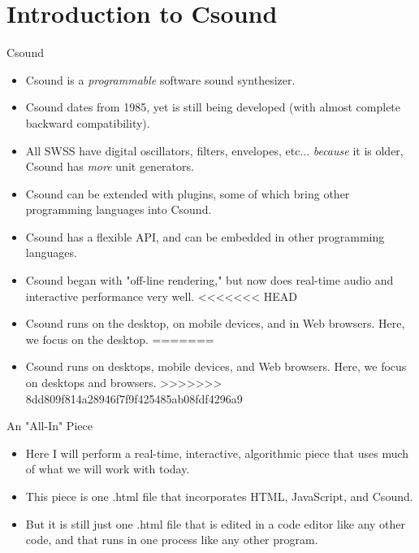 \documentclass{beamer}
\begin{document}
    \section{Introduction to Csound}
    \begin{frame}{Csound}
        \begin{itemize}
            \item Csound is a \textit{programmable} software sound synthesizer.
            \item Csound dates from 1985, yet is still being developed (with almost
            complete backward compatibility).
            \item All SWSS have digital oscillators, filters, envelopes, etc...
            \textit{because} it is older, Csound has \textit{more} unit generators.
            \item Csound can be extended with plugins, some of which bring other
            programming languages into Csound. 
            \item Csound has a flexible API, and can be embedded in other
            programming languages.
            \item Csound began with "off-line rendering," but now does real-time
            audio and interactive performance very well.
<<<<<<< HEAD
            \item Csound runs on the desktop, on mobile devices, and in Web
            browsers. Here, we focus on the desktop. 
=======
            \item Csound runs on desktops, mobile devices, and Web
            browsers. Here, we focus on desktops and browsers.
>>>>>>> 8dd809f814a28946f7f9f425485ab08fdf4296a9
        \end{itemize}
    \end{frame}
    \begin{frame}{An "All-In" Piece}
        \begin{itemize}
            \item Here I will perform a real-time, interactive, algorithmic piece
            that uses much of what we will work with today.
            \item This piece is one .html file that incorporates  HTML, JavaScript, and Csound.
            \item But it is still just one .html file that is edited in a code editor
            like any other code, and that runs in one process like any other program.
        \end{itemize}
    \end{frame}
    
\end{document}
